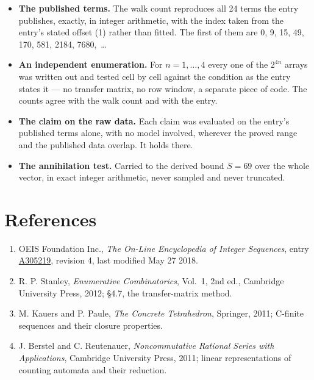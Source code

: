 \documentclass[11pt]{article}
\theoremstyle{definition}
\begin{document}
\begin{itemize}

\item {\bfseries The published terms.} The walk count reproduces all 24 terms the entry publishes, exactly, in integer arithmetic, with the index taken from the entry's stated offset (1) rather than fitted. The first of them are 0, 9, 15, 49, 170, 581, 2184, 7680,~\dots

\item {\bfseries An independent enumeration.} For $n = 1,\dots,4$ every one of the $2^{4n}$ arrays was written out and tested cell by cell against the condition as the entry states it --- no transfer matrix, no row window, a separate piece of code. The counts agree with the walk count and with the entry.

\item {\bfseries The claim on the raw data.} Each claim was evaluated on the entry's published terms alone, with no model involved, wherever the proved range and the published data overlap. It holds there.

\item {\bfseries The annihilation test.} Carried to the derived bound $S = 69$ over the whole vector, in exact integer arithmetic, never sampled and never truncated.

\end{itemize}

\section{References}

\begin{enumerate}

\item OEIS Foundation Inc., \emph{The On-Line Encyclopedia of Integer Sequences}, entry \href{https://oeis.org/A305219}{A305219}, revision 4, last modified May 27 2018.

\item R. P. Stanley, \emph{Enumerative Combinatorics}, Vol.~1, 2nd ed., Cambridge University Press, 2012; \S4.7, the transfer-matrix method.

\item M. Kauers and P. Paule, \emph{The Concrete Tetrahedron}, Springer, 2011; C-finite sequences and their closure properties.

\item J. Berstel and C. Reutenauer, \emph{Noncommutative Rational Series with Applications}, Cambridge University Press, 2011; linear representations of counting automata and their reduction.

\end{enumerate}
\end{document}

